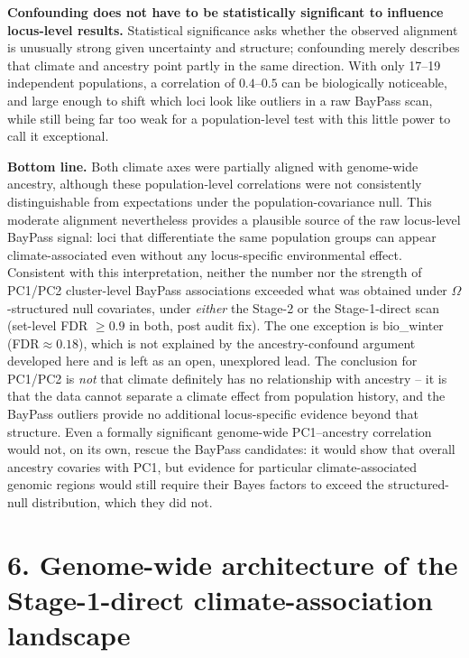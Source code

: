 \documentclass[11pt]{article}
\begin{document}
\textbf{Confounding does not have to be statistically significant to influence
locus-level results.} Statistical significance asks whether the observed alignment is
unusually strong given uncertainty and structure; confounding merely describes that climate
and ancestry point partly in the same direction. With only 17--19 independent populations, a
correlation of $0.4$--$0.5$ can be biologically noticeable, and large enough to shift which
loci look like outliers in a raw BayPass scan, while still being far too weak for a
population-level test with this little power to call it exceptional.

\textbf{Bottom line.} Both climate axes were partially aligned with genome-wide ancestry,
although these population-level correlations were not consistently distinguishable from
expectations under the population-covariance null. This moderate alignment nevertheless
provides a plausible source of the raw locus-level BayPass signal: loci that differentiate
the same population groups can appear climate-associated even without any locus-specific
environmental effect. Consistent with this interpretation, neither the number nor the
strength of PC1/PC2 cluster-level BayPass associations exceeded what was obtained under
$\Omega$-structured null covariates, under \emph{either} the Stage-2 or the Stage-1-direct
scan (set-level FDR $\geq0.9$ in both, post audit fix). The one exception is bio\_winter
(FDR$\approx0.18$), which is not explained by the ancestry-confound argument developed here
and is left as an open, unexplored lead. The conclusion for PC1/PC2 is \emph{not} that
climate definitely has no relationship with ancestry -- it is that the data cannot separate
a climate effect from population history, and the BayPass outliers provide no additional
locus-specific evidence beyond that structure. Even a formally significant genome-wide
PC1--ancestry
correlation would not, on its own, rescue the BayPass candidates: it would show that overall
ancestry covaries with PC1, but evidence for particular climate-associated genomic regions
would still require their Bayes factors to exceed the structured-null distribution, which
they did not.

\clearpage
\section*{\color{Accent}6. Genome-wide architecture of the Stage-1-direct climate-association landscape}
\end{document}

